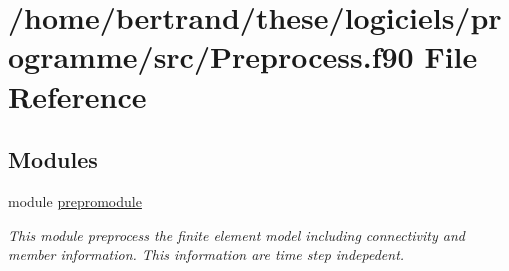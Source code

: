 \hypertarget{_preprocess_8f90}{}\section{/home/bertrand/these/logiciels/programme/src/\+Preprocess.f90 File Reference}
\label{_preprocess_8f90}
\subsection*{Modules}
\begin{DoxyCompactItemize}
\item 
module \hyperlink{namespaceprepromodule}{prepromodule}
\begin{DoxyCompactList}\small\item\em This module preprocess the finite element model including connectivity and member information. This information are time step indepedent. \end{DoxyCompactList}\end{DoxyCompactItemize}
